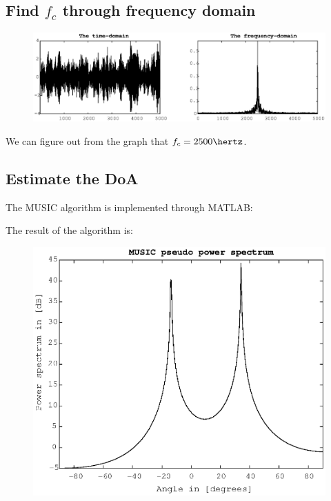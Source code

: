 \documentclass[UTF8]{article}
\begin{document}
\subsection{Find $f_c$ through frequency domain}

\begin{figure}[h]
    \centering
    \includegraphics[scale=0.66]{img/fig02.eps}\\
\end{figure}

We can figure out from the graph that $f_c = 2500\hertz$.

\subsection{Estimate the DoA}
The MUSIC algorithm is implemented through MATLAB:


The result of the algorithm is:

\begin{figure}[H]
    \centering 
    \includegraphics[scale=0.5]{img/fig01.eps}\\
\end{figure}
\end{document}
